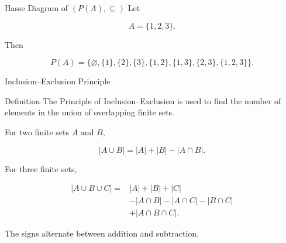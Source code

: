 \documentclass[aspectratio=169]{beamer}
\begin{document}
\begin{frame}{Hasse Diagram of $(P(A),\subseteq)$}
Let

\[
A=\{1,2,3\}.
\]

Then

\[
P(A)=
\{\varnothing,\{1\},\{2\},\{3\},
\{1,2\},\{1,3\},\{2,3\},\{1,2,3\}\}.
\]

\begin{center}
\end{center}
\end{frame}


\begin{frame}{Inclusion--Exclusion Principle}
\begin{block}{Definition}
The Principle of Inclusion--Exclusion is used to find the number of elements in the union of overlapping finite sets.
\end{block}

For two finite sets $A$ and $B$,

\[
|A\cup B|
=
|A|+|B|-|A\cap B|.
\]

For three finite sets,

\[
\begin{aligned}
|A\cup B\cup C|
={}&|A|+|B|+|C|\\
&-|A\cap B|-|A\cap C|-|B\cap C|\\
&+|A\cap B\cap C|.
\end{aligned}
\]

The signs alternate between addition and subtraction.
\end{frame}
\end{document}
